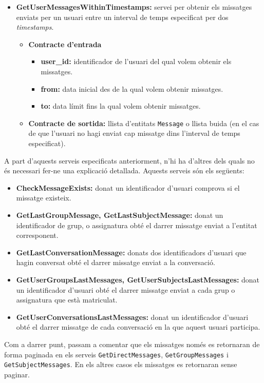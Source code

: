 \begin{itemize}
			\item \textbf{GetUserMessagesWithinTimestamps:} servei per obtenir els missatges enviats per un usuari entre un interval de temps especificat per dos \emph{timestamps}.
			
				\begin{itemize}
					\item \textbf{Contracte d'entrada}
						\begin{itemize}
							\item \textbf{user\_id:} identificador de l'usuari del qual volem obtenir els missatges.
							\item \textbf{from:} data inicial des de la qual volem obtenir missatges.
							\item \textbf{to:} data límit fins la qual volem obtenir missatges.
						\end{itemize}
					\item \textbf{Contracte de sortida:} llista d'entitats \texttt{Message} o llista buida (en el cas de que l'usuari no hagi enviat cap missatge dins l'interval de temps especificat).
			\end{itemize}
		\end{itemize}
		
	A part d'aquests serveis especificats anteriorment, n'hi ha d'altres dels quals no és necessari fer-ne una explicació detallada. Aquests serveis són els següents:
	
	\begin{itemize}
		\item \textbf{CheckMessageExists:} donat un identificador d'usuari comprova si el missatge existeix.
		\item \textbf{GetLastGroupMessage, GetLastSubjectMessage:} donat un identificador de grup, o assignatura obté el darrer missatge enviat a l'entitat corresponent.
		\item \textbf{GetLastConversationMessage:} donats dos identificadors d'usuari que hagin conversat obté el darrer missatge enviat a la conversació.
		\item \textbf{GetUserGroupsLastMessages, GetUserSubjectsLastMessages:} donat un identificador d'usuari obté el darrer missatge enviat a cada grup o assignatura que està matriculat.
		\item \textbf{GetUserConversationsLastMessages:} donat un identificador d'usuari obté el darrer missatge de cada conversació en la que aquest usuari participa.
	\end{itemize}
	
	Com a darrer punt, passam a comentar que els missatges només es retornaran de forma paginada en els serveis \texttt{GetDirectMessages}, \texttt{GetGroupMessages} i \texttt{GetSubjectMessages}. En els altres casos els missatges es retornaran sense paginar.
